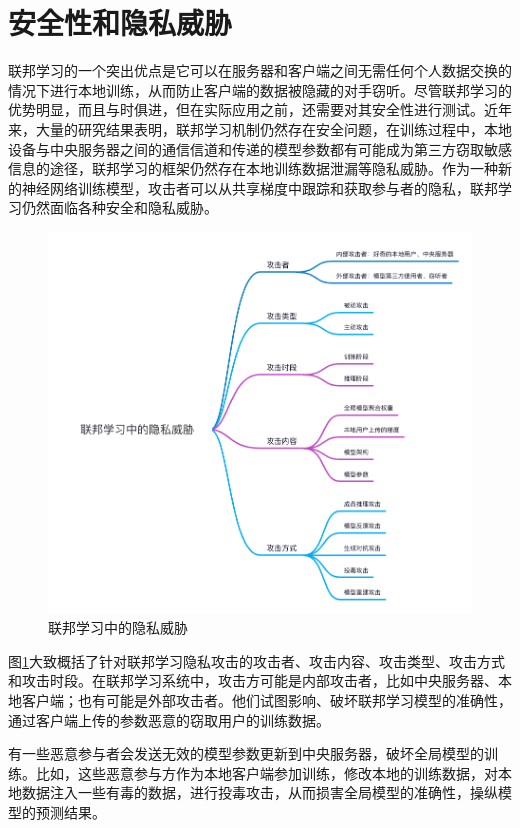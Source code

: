 \section{安全性和隐私威胁}
联邦学习的一个突出优点是它可以在服务器和客户端之间无需任何个人数据交换的情况下进行本地训练，从而防止客户端的数据被隐藏的对手窃听。尽管联邦学习的优势明显，而且与时俱进，但在实际应用之前，还需要对其安全性进行测试。近年来，大量的研究结果表明，联邦学习机制仍然存在安全问题，在训练过程中，本地设备与中央服务器之间的通信信道和传递的模型参数都有可能成为第三方窃取敏感信息的途径，联邦学习的框架仍然存在本地训练数据泄漏等隐私威胁。作为一种新的神经网络训练模型，攻击者可以从共享梯度中跟踪和获取参与者的隐私，联邦学习仍然面临各种安全和隐私威胁。

\begin{figure}[!hbt]
\centering
	\includegraphics[scale=0.5]{fig2/C1/联邦学习中的隐私威胁}%
	\caption{联邦学习中的隐私威胁}
	\label{fig:联邦学习中的隐私威胁}	
\end{figure}

图\ref{fig:联邦学习中的隐私威胁}大致概括了针对联邦学习隐私攻击的攻击者、攻击内容、攻击类型、攻击方式和攻击时段。在联邦学习系统中，攻击方可能是内部攻击者，比如中央服务器、本地客户端；也有可能是外部攻击者。他们试图影响、破坏联邦学习模型的准确性，通过客户端上传的参数恶意的窃取用户的训练数据。

有一些恶意参与者会发送无效的模型参数更新到中央服务器，破坏全局模型的训练。比如，这些恶意参与方作为本地客户端参加训练，修改本地的训练数据，对本地数据注入一些有毒的数据，进行投毒攻击，从而损害全局模型的准确性，操纵模型的预测结果。

